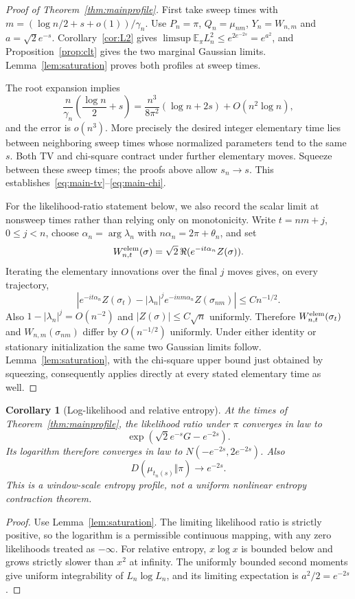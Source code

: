 \documentclass[11pt]{article}
\newtheorem{corollary}[theorem]{Corollary}
\theoremstyle{remark}
\newcommand{\E}{\mathbb E}
\begin{document}
\begin{proof}[Proof of Theorem~\ref{thm:mainprofile}]
First take sweep times with
$m=(\log n/2+s+o(1))/\gamma_n$. Use $P_n=\pi$, $Q_n=\mu_{nm}$,
$Y_n=W_{n,m}$ and $a=\sqrt2e^{-s}$. Corollary~\ref{cor:L2} gives
$\limsup\E_\pi L_n^2\leq e^{2e^{-2s}}=e^{a^2}$, and Proposition~\ref{prop:clt} gives the two marginal Gaussian limits. Lemma~\ref{lem:saturation} proves both profiles at sweep times.

The root expansion implies
\[
 \frac{n}{\gamma_n}\left(\frac{\log n}2+s\right)
 =\frac{n^3}{8\pi^2}(\log n+2s)+O(n^2\log n),
\]
and the error is $o(n^3)$. More precisely the desired integer elementary time lies between neighboring sweep times whose normalized parameters tend to the same $s$. Both TV and chi-square contract under further elementary moves. Squeeze between these sweep times; the proofs above allow $s_n\to s$. This establishes~\eqref{eq:main-tv}--\eqref{eq:main-chi}.

For the likelihood-ratio statement below, we also record the scalar limit at nonsweep times rather than relying only on monotonicity. Write $t=nm+j$, $0\leq j<n$, choose $\alpha_n=\arg\lambda_n$ with $n\alpha_n=2\pi+\theta_n$, and set
\[
 W_{n,t}^{\rm elem}(\sigma)=\sqrt2\,\Re(e^{-it\alpha_n}Z(\sigma)).
\]
Iterating the elementary innovations over the final $j$ moves gives, on every trajectory,
\[
 \left|e^{-it\alpha_n}Z(\sigma_t)
       -|\lambda_n|^j e^{-inm\alpha_n}Z(\sigma_{nm})\right|
 \leq Cn^{-1/2}.
\]
Also $1-|\lambda_n|^j=O(n^{-2})$ and $|Z(\sigma)|\leq C\sqrt n$ uniformly. Therefore $W_{n,t}^{\rm elem}(\sigma_t)$ and $W_{n,m}(\sigma_{nm})$ differ by $O(n^{-1/2})$ uniformly. Under either identity or stationary initialization the same two Gaussian limits follow. Lemma~\ref{lem:saturation}, with the chi-square upper bound just obtained by squeezing, consequently applies directly at every stated elementary time as well.
\end{proof}

\begin{corollary}[Log-likelihood and relative entropy]
At the times of Theorem~\ref{thm:mainprofile}, the likelihood ratio under $\pi$ converges in law to
\[
 \exp\!\left(\sqrt2e^{-s}G-e^{-2s}\right).
\]
Its logarithm therefore converges in law to $N(-e^{-2s},2e^{-2s})$. Also
\[
 D(\mu_{t_n(s)}\Vert\pi)\longrightarrow e^{-2s}.
\]
This is a window-scale entropy profile, not a uniform nonlinear entropy contraction theorem.
\end{corollary}
\begin{proof}
Use Lemma~\ref{lem:saturation}. The limiting likelihood ratio is strictly positive, so the logarithm is a permissible continuous mapping, with any zero likelihoods treated as $-\infty$. For relative entropy, $x\log x$ is bounded below and grows strictly slower than $x^2$ at infinity. The uniformly bounded second moments give uniform integrability of $L_n\log L_n$, and its limiting expectation is $a^2/2=e^{-2s}$.
\end{proof}
\end{document}
